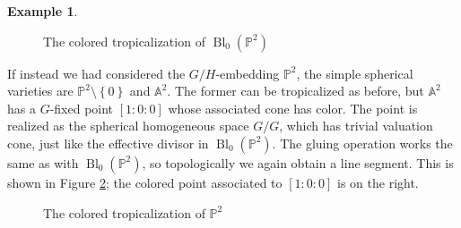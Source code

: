 \documentclass[12pt,twoside,cd]{amsart}
\theoremstyle{definition}
\newtheorem{example}[theorem]{Example}
\begin{document}
\begin{example}
\begin{figure}[!h]
\begin{center}
\caption{The colored tropicalization of ${\operatorname{Bl}}_0(\mathbb{P}^2)$}
\label{BLP2}
\end{center}
\end{figure}
If instead we had considered the $G/H$-embedding $\mathbb{P}^2$, the simple spherical varieties are $\mathbb{P}^2 \setminus {\left\lbrace {0} \right\rbrace}$ and $\mathbb{A}^2$. The former can be tropicalized as before, but $\mathbb{A}^2$ has a $G$-fixed point $[1:0:0]$ whose associated cone has color.
The point is realized as the spherical homogeneous space $G/G$, which has trivial valuation cone, just like the effective divisor in ${\operatorname{Bl}}_0(\mathbb{P}^2)$.
The gluing operation works the same as with ${\operatorname{Bl}}_0(\mathbb{P}^2)$, so topologically we again obtain a line segment.
This is shown in Figure \ref{ColP2}; the colored point associated to $[1:0:0]$ is on the right.  
\begin{figure}[!h]
\begin{center}
\caption{The colored tropicalization of $\mathbb{P}^2$}
\label{ColP2}
\end{center}
\end{figure} 
\end{example}
\end{document}
